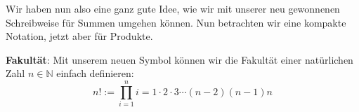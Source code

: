 Wir haben nun also eine ganz gute Idee, wie wir mit unserer neu gewonnenen Schreibweise für Summen umgehen können. Nun betrachten wir eine kompakte Notation, jetzt aber für Produkte. 

\begin{definition}[Produkte]
    
\end{definition}

\begin{example}
    \begin{thmenum}
        \item \textbf{Fakultät}: Mit unserem neuen Symbol können wir die Fakultät einer natürlichen Zahl \(n \in \mathbb N\) einfach definieren: 
        \begin{equation*}
            n! := \prod_{i=1}^n i = 1\cdot 2 \cdot 3 \cdots (n-2)(n-1)n
        \end{equation*}

        \item 
    \end{thmenum}
\end{example}

\begin{proposition}
    
\end{proposition}
